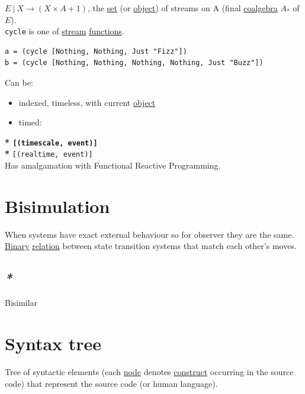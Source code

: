 \documentclass[a4paper,14pt,oneside]{book}
\begin{document}
\(E \ | \ X \to (X \times A + 1)\), the \hyperref[orge119629]{set} (or \hyperref[org5771609]{object}) of streams on A (final \hyperref[org9c34c7f]{coalgebra} \(A_{*}\) of \(E\)).\\

\texttt{cycle} is one of \hyperref[org49c597a]{stream} \hyperref[org0bd6046]{functions}.\\
\begin{verbatim}
a = (cycle [Nothing, Nothing, Just "Fizz"])
b = (cycle [Nothing, Nothing, Nothing, Nothing, Just "Buzz"])
\end{verbatim}

Can be:\\
\begin{itemize}
\item indexed, timeless, with current \hyperref[org5771609]{object}\\
\item timed:\\
\end{itemize}
\textbf{* \texttt{[(timescale, event)]}\\
*} \texttt{[(realtime, event)]}\\

Has amalgamation with Functional Reactive Programming.\\

\chapter{\label{orgef1c78b}Bisimulation}
\label{sec:org2b240ba}
When systems have exact external behaviour so for observer they are the same.\\

\hyperref[orgd0575cd]{Binary} \hyperref[org70d7aba]{relation} between state transition systems that match each other's moves.\\

\section{\emph{*}}
\label{sec:org0a17c0f}

\label{org7499e21}Bisimilar\\

\chapter{\label{org1e5eb45}Syntax tree}
\label{sec:org0d122ca}
Tree of syntactic elements (each \hyperref[orga5937e3]{node} denotes \hyperref[org95d345f]{construct} occurring in the source code) that represent the source code (or human language).\\
\end{document}
